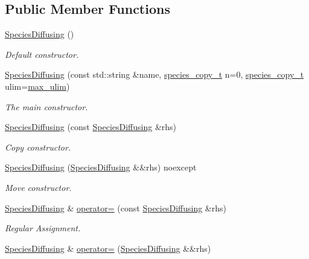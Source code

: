 \subsection*{Public Member Functions}
\begin{DoxyCompactItemize}
\item 
\hyperlink{classchem_1_1SpeciesDiffusing_a2f590ce263086be62eb7998afd4abda4}{Species\-Diffusing} ()
\begin{DoxyCompactList}\small\item\em Default constructor. \end{DoxyCompactList}\item 
\hyperlink{classchem_1_1SpeciesDiffusing_aa0183d61ee28bcc845674d3b649bf100}{Species\-Diffusing} (const std\-::string \&name, \hyperlink{common_8h_a3503f321fd36304ee274141275cca586}{species\-\_\-copy\-\_\-t} n=0, \hyperlink{common_8h_a3503f321fd36304ee274141275cca586}{species\-\_\-copy\-\_\-t} ulim=\hyperlink{common_8h_adaf831a0b61083f29adf8fc6e8edab35}{max\-\_\-ulim})
\begin{DoxyCompactList}\small\item\em The main constructor. \end{DoxyCompactList}\item 
\hyperlink{classchem_1_1SpeciesDiffusing_ae5a9f9e77809772866d2bbfb440ae817}{Species\-Diffusing} (const \hyperlink{classchem_1_1SpeciesDiffusing}{Species\-Diffusing} \&rhs)
\begin{DoxyCompactList}\small\item\em Copy constructor. \end{DoxyCompactList}\item 
\hyperlink{classchem_1_1SpeciesDiffusing_a560f9bc8c0d7da4a91a969e78917afa4}{Species\-Diffusing} (\hyperlink{classchem_1_1SpeciesDiffusing}{Species\-Diffusing} \&\&rhs) noexcept
\begin{DoxyCompactList}\small\item\em Move constructor. \end{DoxyCompactList}\item 
\hyperlink{classchem_1_1SpeciesDiffusing}{Species\-Diffusing} \& \hyperlink{classchem_1_1SpeciesDiffusing_a88592474fe2dd281951e15c6b8ddf201}{operator=} (const \hyperlink{classchem_1_1SpeciesDiffusing}{Species\-Diffusing} \&rhs)
\begin{DoxyCompactList}\small\item\em Regular Assignment. \end{DoxyCompactList}\item 
\hyperlink{classchem_1_1SpeciesDiffusing}{Species\-Diffusing} \& \hyperlink{classchem_1_1SpeciesDiffusing_add1696a25d2174de8078ef509b313890}{operator=} (\hyperlink{classchem_1_1SpeciesDiffusing}{Species\-Diffusing} \&\&rhs)

\end{DoxyCompactItemize}
